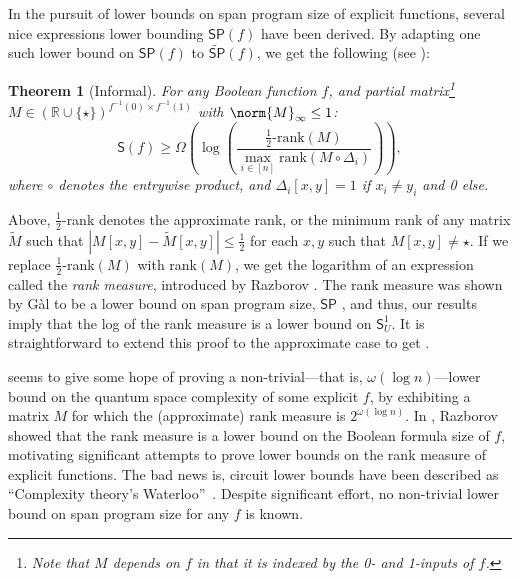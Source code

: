 \documentclass[11pt]{article}
\numberwithin{equation}{section}
\newtheorem{theorem}{Theorem}[section]
\theoremstyle{definition}
\theoremstyle{plain}
\newcommand{\R}{\mathbb R}
\begin{document}
In the pursuit of lower bounds on span program size of
%
explicit  %
functions, several nice expressions lower bounding $\mathsf{SP}(f)$ have been derived.
By adapting one such lower bound on $\mathsf{SP}(f)$ to $\widetilde{\mathsf{SP}}(f)$, we get the following (see ):
\begin{theorem}[Informal]\label{thm:lb}
For any Boolean function $f$, and \emph{partial matrix}\footnote{Note that $M$ depends on $f$ in that it is indexed by the 0- and 1-inputs of $f$.} $M\in (\R\cup\{\star\})^{f^{-1}(0)\times f^{-1}(1)}$ with $\norm{M}_\infty\leq 1$:
$$\mathsf{S}(f)\geq \Omega\left(\log\left(\frac{\frac{1}{2}\mbox{-}\mathrm{rank}(M)}{\max_{i\in [n]}\mathrm{rank}(M\circ\Delta_i)}\right)\right),$$
where $\circ$ denotes the entrywise product, and $\Delta_i[x,y]=1$ if $x_i\neq y_i$ and 0 else.
\end{theorem}
Above, $\frac{1}{2}$-rank denotes the approximate rank, or the minimum rank of any matrix $\widetilde{M}$ such that $|M[{x,y}]-\widetilde{M}[{x,y}]|\leq \frac{1}{2}$ for each $x,y$ such that $M[x,y]\neq \star$. If we replace $\frac{1}{2}$-rank$(M)$ with rank$(M)$, we get the logarithm of an expression called the \emph{rank measure}, introduced by Razborov \cite{Raz90}. The rank measure was shown by G\`al to be a lower bound on span program size, $\mathsf{SP}$ \cite{Gal01}, and thus, our results imply that the log of the rank measure is a lower bound on $\mathsf{S}_U^1$. It is straightforward to extend this proof to the approximate case to get .

 seems to give some hope of proving a non-trivial---that is, $\omega(\log n)$---lower bound on the quantum space complexity of some explicit $f$, by exhibiting a matrix $M$ for which the (approximate) rank measure is $2^{\omega(\log n)}$.
In \cite{Raz90}, Razborov showed that the rank measure is a lower bound on the Boolean formula size of $f$, motivating significant attempts to prove lower bounds on the rank measure of explicit functions. The bad news is, circuit lower bounds have been described as ``Complexity theory's Waterloo''~\cite{AB09}. Despite significant effort, no non-trivial lower bound on span program size for any $f$ is known. 
\end{document}
